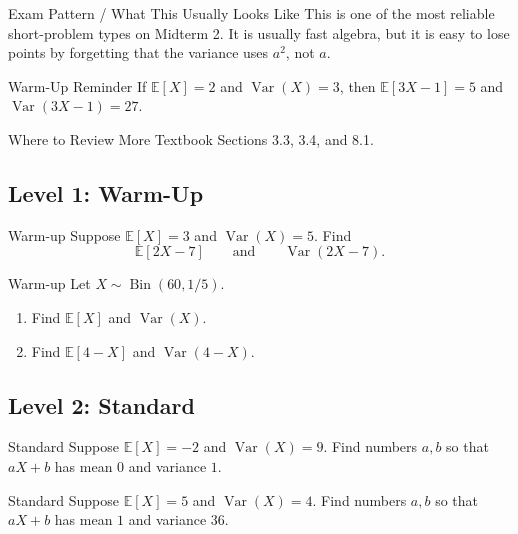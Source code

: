 \documentclass[12pt]{article}
\newcommand{\EE}{\mathbb{E}}
\newcommand{\Var}{\operatorname{Var}}
\newcommand{\Bin}{\operatorname{Bin}}
\newcommand{\writespace}[1]{\vspace*{#1}}
\newcommand{\shortws}{\writespace{1.1cm}}
\newcommand{\medws}{\writespace{1.8cm}}
\newcounter{problem}[section]
\begin{document}
\begin{patternbox}{Exam Pattern / What This Usually Looks Like}
This is one of the most reliable short-problem types on Midterm 2. It is usually fast algebra, but it is easy to lose points by forgetting that the variance uses $a^2$, not $a$.
\end{patternbox}

\begin{examplebox}{Warm-Up Reminder}
If $\EE[X]=2$ and $\Var(X)=3$, then $\EE[3X-1]=5$ and $\Var(3X-1)=27$.
\end{examplebox}

\begin{reviewbox}{Where to Review More}
Textbook Sections 3.3, 3.4, and 8.1.
\end{reviewbox}

\subsection*{Level 1: Warm-Up}

\begin{practiceproblem}{Warm-up}
Suppose $\EE[X]=3$ and $\Var(X)=5$. Find
\[
  \EE[2X-7]
  \qquad\text{and}\qquad
  \Var(2X-7).
\]
\end{practiceproblem}
\shortws

\begin{practiceproblem}{Warm-up}
Let $X\sim\Bin(60,1/5)$.
\begin{enumerate}
  \item Find $\EE[X]$ and $\Var(X)$.
  \item Find $\EE[4-X]$ and $\Var(4-X)$.
\end{enumerate}
\end{practiceproblem}
\medws

\subsection*{Level 2: Standard}

\begin{practiceproblem}{Standard}
Suppose $\EE[X]=-2$ and $\Var(X)=9$. Find numbers $a,b$ so that $aX+b$ has mean $0$ and variance $1$.
\end{practiceproblem}
\medws

\begin{practiceproblem}{Standard}
Suppose $\EE[X]=5$ and $\Var(X)=4$. Find numbers $a,b$ so that $aX+b$ has mean $1$ and variance $36$.
\end{practiceproblem}
\medws
\end{document}
